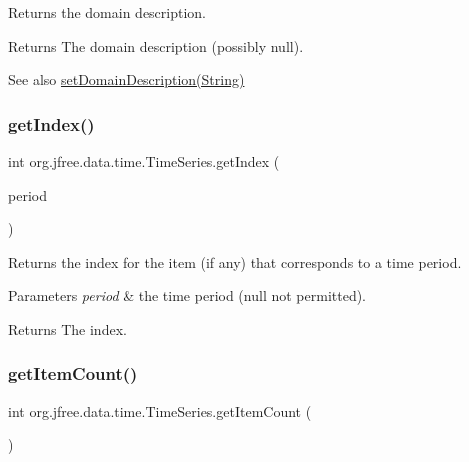 Returns the domain description.

\begin{DoxyReturn}{Returns}
The domain description (possibly {\ttfamily null}).
\end{DoxyReturn}
\begin{DoxySeeAlso}{See also}
\mbox{\hyperlink{classorg_1_1jfree_1_1data_1_1time_1_1_time_series_ad44fd7f203d6ba10a356a1bb55abbbc9}{set\+Domain\+Description(\+String)}} 
\end{DoxySeeAlso}
\mbox{\label{classorg_1_1jfree_1_1data_1_1time_1_1_time_series_ace0ed3b754ab547178a9dab7c0f6c6e3}} 
\subsubsection{\texorpdfstring{get\+Index()}{getIndex()}}
{\footnotesize\ttfamily int org.\+jfree.\+data.\+time.\+Time\+Series.\+get\+Index (\begin{DoxyParamCaption}\item[{\mbox{\hyperlink{classorg_1_1jfree_1_1data_1_1time_1_1_regular_time_period}{Regular\+Time\+Period}}}]{period }\end{DoxyParamCaption})}

Returns the index for the item (if any) that corresponds to a time period.


\begin{DoxyParams}{Parameters}
{\em period} & the time period ({\ttfamily null} not permitted).\\
\hline
\end{DoxyParams}
\begin{DoxyReturn}{Returns}
The index. 
\end{DoxyReturn}
\mbox{\label{classorg_1_1jfree_1_1data_1_1time_1_1_time_series_a21bdc5039a20c6d5c31cdcdd741d980e}} 
\subsubsection{\texorpdfstring{get\+Item\+Count()}{getItemCount()}}
{\footnotesize\ttfamily int org.\+jfree.\+data.\+time.\+Time\+Series.\+get\+Item\+Count (\begin{DoxyParamCaption}{ }\end{DoxyParamCaption})}

